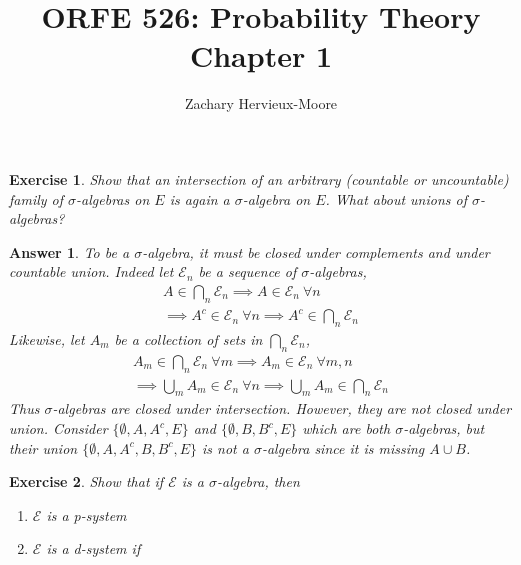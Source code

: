 \documentclass[12pt]{article}
\title{ORFE 526: Probability Theory \\ Chapter 1}
\author{Zachary Hervieux-Moore}
\theoremstyle{colon}
\newtheorem{exercise}{Exercise}
\newtheorem*{answer}{Answer}
\begin{document}
\maketitle

\clearpage

\begin{exercise}
  Show that an intersection of an arbitrary (countable or uncountable) family of $\sigma$-algebras on $E$ is again a $\sigma$-algebra on $E$. What about unions of $\sigma$-algebras?
\end{exercise}

\begin{answer}
  To be a $\sigma$-algebra, it must be closed under complements and under countable union. Indeed let $\mathcal{E}_n$ be a sequence of $\sigma$-algebras,
  \begin{gather*}
    A \in \bigcap_n \mathcal{E}_n \implies A \in \mathcal{E}_n \ \forall n\\
    \implies A^c \in \mathcal{E}_n \ \forall n \implies A^c \in \bigcap_n \mathcal{E}_n
  \end{gather*}
  Likewise, let $A_m$ be a collection of sets in $\bigcap_n \mathcal{E}_n$,
  \begin{gather*}
    A_m \in \bigcap_n \mathcal{E}_n \ \forall m \implies A_m \in \mathcal{E}_n \ \forall m,n\\
    \implies \bigcup_m A_m \in \mathcal{E}_n \ \forall n \implies \bigcup_m A_m \in \bigcap_n \mathcal{E}_n
  \end{gather*}
  Thus $\sigma$-algebras are closed under intersection. However, they are not closed under union. Consider $\{\emptyset, A, A^c, E\}$ and $\{\emptyset, B, B^c, E\}$ which are both $\sigma$-algebras, but their union $\{\emptyset, A, A^c, B, B^c, E\}$ is not a $\sigma$-algebra since it is missing $A \cup B$.
\end{answer}

\clearpage

\begin{exercise}
  Show that if $\mathcal{E}$ is a $\sigma$-algebra, then
  \begin{enumerate}[label=\roman*)]
    \item $\mathcal{E}$ is a p-system
    \item $\mathcal{E}$ is a d-system if
  \end{enumerate}
\end{exercise}
\end{document}
